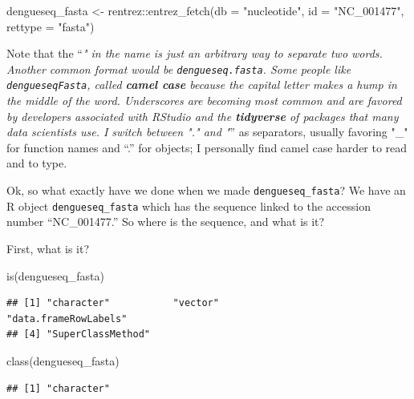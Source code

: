 \documentclass[
]{book}
\newenvironment{Shaded}{\begin{snugshade}}{\end{snugshade}}
\newcommand{\AttributeTok}[1]{\textcolor[rgb]{0.77,0.63,0.00}{#1}}
\newcommand{\FunctionTok}[1]{\textcolor[rgb]{0.00,0.00,0.00}{#1}}
\newcommand{\NormalTok}[1]{#1}
\newcommand{\OtherTok}[1]{\textcolor[rgb]{0.56,0.35,0.01}{#1}}
\newcommand{\SpecialCharTok}[1]{\textcolor[rgb]{0.00,0.00,0.00}{#1}}
\newcommand{\StringTok}[1]{\textcolor[rgb]{0.31,0.60,0.02}{#1}}
\begin{document}
\begin{Shaded}
\begin{Highlighting}[]
\NormalTok{dengueseq\_fasta }\OtherTok{\textless{}{-}}\NormalTok{ rentrez}\SpecialCharTok{::}\FunctionTok{entrez\_fetch}\NormalTok{(}\AttributeTok{db =} \StringTok{"nucleotide"}\NormalTok{, }
                          \AttributeTok{id =} \StringTok{"NC\_001477"}\NormalTok{, }
                          \AttributeTok{rettype =} \StringTok{"fasta"}\NormalTok{)}
\end{Highlighting}
\end{Shaded}

Note that the ``\emph{" in the name is just an arbitrary way to separate two words. Another common format would be \texttt{dengueseq.fasta}. Some people like \texttt{dengueseqFasta}, called \textbf{camel case} because the capital letter makes a hump in the middle of the word. Underscores are becoming most common and are favored by developers associated with RStudio and the \textbf{tidyverse} of packages that many data scientists use. I switch between "." and "}'' as separators, usually favoring "\_" for function names and ``.'' for objects; I personally find camel case harder to read and to type.

Ok, so what exactly have we done when we made \texttt{dengueseq\_fasta}? We have an R object \texttt{dengueseq\_fasta} which has the sequence linked to the accession number ``NC\_001477.'' So where is the sequence, and what is it?

First, what is it?

\begin{Shaded}
\begin{Highlighting}[]
\FunctionTok{is}\NormalTok{(dengueseq\_fasta)}
\end{Highlighting}
\end{Shaded}

\begin{verbatim}
## [1] "character"           "vector"              "data.frameRowLabels"
## [4] "SuperClassMethod"
\end{verbatim}

\begin{Shaded}
\begin{Highlighting}[]
\FunctionTok{class}\NormalTok{(dengueseq\_fasta)}
\end{Highlighting}
\end{Shaded}

\begin{verbatim}
## [1] "character"
\end{verbatim}
\end{document}
